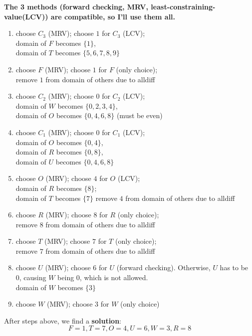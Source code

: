 \documentclass[UTF8]{article}
\begin{document}
\noindent \textbf{The 3 methods (forward checking, MRV, least-constraining-value(LCV)) are compatible, so I'll use them all.}

\begin{enumerate}[label={\arabic*. }]
\item choose $C_3$ (MRV); choose $1$ for $C_3$ (LCV); \\
domain of $F$ becomes $\{1\}$, \\
domain of $T$ becomes $\{5,6,7,8,9\}$
\item choose $F$ (MRV); choose $1$ for $F$ (only choice); \\
remove $1$ from domain of others due to alldiff
\item choose $C_2$ (MRV); choose $0$ for $C_2$ (LCV); \\
domain of $W$ becomes $\{0,2,3,4\}$, \\
domain of $O$ becomes $\{0,4,6,8\}$ (must be even)
\item choose $C_1$ (MRV); choose $0$ for $C_1$ (LCV); \\
domain of $O$ becomes $\{0,4\}$, \\
domain of $R$ becomes $\{0,8\}$, \\
domain of $U$ becomes $\{0,4,6,8\}$
\item choose $O$ (MRV); choose $4$ for $O$ (LCV); \\
domain of $R$ becomes $\{8\}$; \\
domain of $T$ becomes $\{7\}$
remove $4$ from domain of others due to alldiff
\item choose $R$ (MRV); choose $8$ for $R$ (only choice); \\
remove $8$ from domain of others due to alldiff
\item choose $T$ (MRV); choose $7$ for $T$ (only choice); \\
remove $7$ from domain of others due to alldiff
\item choose $U$ (MRV); choose $6$ for $U$ (forward checking). Otherwise, $U$ has to be 0, causing $W$ being 0, which is not allowed. \\
domain of $W$ becomes $\{3\}$
\item choose $W$ (MRV); choose $3$ for $W$ (only choice)
\end{enumerate}

\noindent After steps above, we find a \textbf{solution}:
$$F=1,T=7,O=4,U=6,W=3,R=8$$

\newpage
\end{document}
